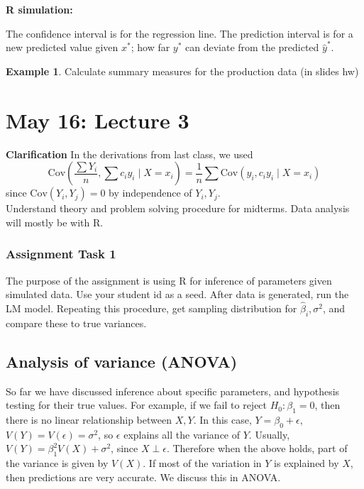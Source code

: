 \documentclass[12pt, a4paper]{article}
\theoremstyle{definition}
\newtheorem{example}{Example}
\newcommand{\eps}{\epsilon}
\newcommand{\f}{\frac}
\newcommand{\BB}[1]{\left(#1\right)}
\newcommand{\Cov}{\mathrm{Cov}}
\begin{document}
		{\bf R simulation:} 
		
		The confidence interval is for the regression line. The prediction interval is for a new predicted value given $x^*$; how far $y^*$ can deviate from the predicted $\hat y^*$.
		
		\begin{example}
			Calculate summary measures for the production data (in slides hw)
		\end{example}
	
		\section{May 16: Lecture 3}
		
		{\bf Clarification } In the derivations from last class, we used
		$$
			\Cov \BB{ \f{\sum Y_i}{n}, \sum c_i y_i \mid X = x_i} = \f1n \sum \Cov(y_i, c_i y_i \mid X = x_i)
		$$
		since $\Cov(Y_i, Y_j) = 0$ by independence of $Y_i, Y_j$.\\
		
		Understand theory and problem solving procedure for midterms. Data analysis will mostly be with R.		
		
		\subsubsection{Assignment Task 1}
		The purpose of the assignment is using R for inference of parameters given simulated data. Use your student id as a seed. After data is generated, run the LM model. Repeating this procedure, get sampling distribution for $\hat\beta_i, \sigma^2$, and compare these to true variances. 
		
		\subsection{Analysis of variance (ANOVA)}
		
		So far we have discussed inference about specific parameters, and hypothesis testing for their true values. For example, if we fail to reject $H_0 : \beta_1 = 0$, then there is no linear relationship between $X,Y$. In this case, $Y = \beta_0 + \eps$, $V(Y) = V(\eps) = \sigma^2$, so $\eps$ explains all the variance of $Y$. Usually, $V(Y) = \beta_1^2 V(X) + \sigma^2$, since $X \perp \eps$. Therefore when the above holds, part of the variance is given by $V(X)$. If most of the variation in $Y$ is explained by $X$, then predictions are very accurate. We discuss this in ANOVA. \\
		
\end{document}
